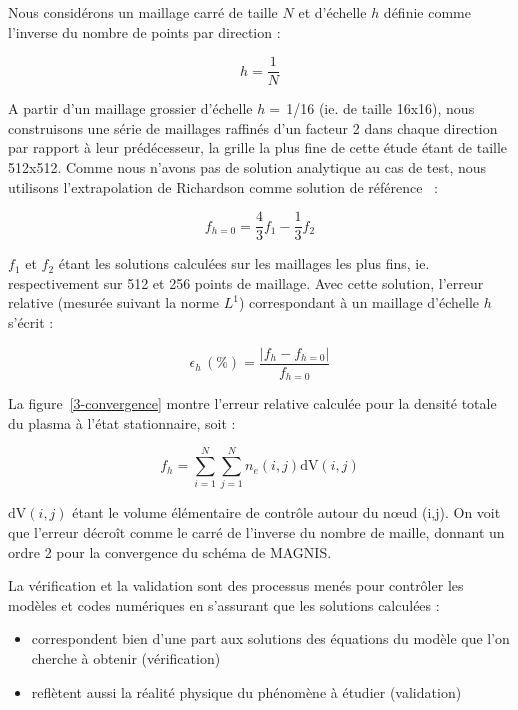 \begin{refsection}
Nous considérons un maillage carré de taille $N$ et d'échelle $h$
définie comme l'inverse du nombre de points par direction :

\begin{equation}
h=\frac{1}{N}
\end{equation}

A partir d'un maillage grossier d'échelle $h=\,$1/16 (ie. de taille 16x16),
nous construisons une série de maillages raffinés d'un facteur 2 dans chaque direction par rapport à leur prédécesseur, la grille la
plus fine de cette étude étant de taille 512x512. Comme nous n'avons pas de
solution analytique au cas de test, nous utilisons l'extrapolation de
Richardson comme solution de référence~\parencite{Roache} :

\begin{equation}
f_{h=0}=\frac{4}{3}f_{1}-\frac{1}{3}f_2
\end{equation}

$f_{1}$ et $f_2$ étant les solutions calculées sur les maillages les plus fins,
ie. respectivement sur 512 et 256 points de maillage. Avec cette solution,
l'erreur relative (mesurée suivant la norme $L^1$) correspondant à un maillage
d'échelle $h$ s'écrit :

\begin{equation}
\epsilon_h\,(\text{\%})=\frac{|f_h-f_{h=0}|}{f_{h=0}}
\end{equation}

La figure~\ref{3-convergence} montre l'erreur relative calculée pour la densité
totale du plasma à l'état stationnaire, soit :

\begin{equation}
f_h=\sum_{i=1}^{N}\sum_{j=1}^{N}n_e(i,j)\text{dV}(i,j)
\end{equation}

$\text{dV}(i,j)$ étant le volume élémentaire de contrôle autour du n\oe ud
(i,j). On voit que l'erreur décroît comme le carré de l'inverse du nombre de
maille, donnant un ordre 2 pour la convergence du schéma de MAGNIS.

La vérification et la validation sont des processus menés
pour contrôler les modèles et codes numériques en s'assurant que les solutions
calculées :

\begin{itemize}
  \item correspondent bien d'une part aux solutions des
  équations du modèle que l'on cherche à obtenir (vérification)
	\item reflètent aussi la réalité
	physique du phénomène à étudier (validation)
	\end{itemize}
	

\end{refsection}
